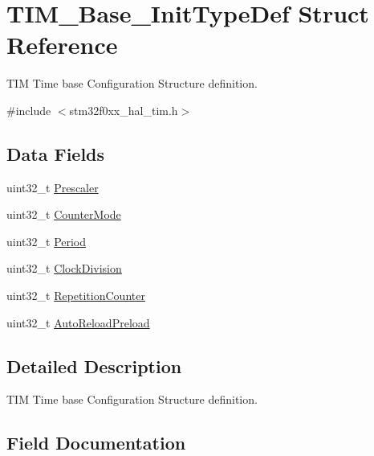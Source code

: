 \hypertarget{struct_t_i_m___base___init_type_def}{}\section{T\+I\+M\+\_\+\+Base\+\_\+\+Init\+Type\+Def Struct Reference}
\label{struct_t_i_m___base___init_type_def}


T\+IM Time base Configuration Structure definition.  




{\ttfamily \#include $<$stm32f0xx\+\_\+hal\+\_\+tim.\+h$>$}

\subsection*{Data Fields}
\begin{DoxyCompactItemize}
\item 
uint32\+\_\+t \hyperlink{struct_t_i_m___base___init_type_def_affb82025da5b8d4a06e61f1690460f4d}{Prescaler}
\item 
uint32\+\_\+t \hyperlink{struct_t_i_m___base___init_type_def_a4b29303489c983d0e9326d7ae0196ceb}{Counter\+Mode}
\item 
uint32\+\_\+t \hyperlink{struct_t_i_m___base___init_type_def_a49500eef6a2354eeee4adc005bf9cef6}{Period}
\item 
uint32\+\_\+t \hyperlink{struct_t_i_m___base___init_type_def_a8f20e02ae2774e1523942604315b8e13}{Clock\+Division}
\item 
uint32\+\_\+t \hyperlink{struct_t_i_m___base___init_type_def_a3c2ea8434bbce30aa191a816e27f9c1f}{Repetition\+Counter}
\item 
uint32\+\_\+t \hyperlink{struct_t_i_m___base___init_type_def_a24796ba26d572a0993cb065a02865723}{Auto\+Reload\+Preload}
\end{DoxyCompactItemize}


\subsection{Detailed Description}
T\+IM Time base Configuration Structure definition. 

\subsection{Field Documentation}
\mbox{\label{struct_t_i_m___base___init_type_def_a24796ba26d572a0993cb065a02865723}} 
